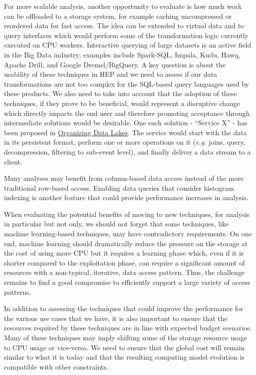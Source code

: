 \documentclass[12pt,a4paper]{article}
\begin{document}
For more scalable analysis, another opportunity to evaluate is how much
work can be offloaded to a storage system, for example caching
uncompressed or reordered data for fast access. The idea can be extended
to virtual data and to query interfaces which would perform some of the
transformation logic currently executed on CPU workers. Interactive
querying of large datasets is an active field in the Big Data industry;
examples include Spark-SQL, Impala, Kudu, Hawq, Apache Drill, and Google
Dremel/BigQuery. A key question is about the usability of these
techniques in HEP and we need to assess if our data transformations are
not too complex for the SQL-based query languages used by these
products. We also need to take into account that the adoption of these
techniques, if they prove to be beneficial, would represent a disruptive
change which directly impacts the end user and therefore promoting
acceptance through intermediate solutions would be desirable. One such solution - ``Service X'' - has been proposed in \href{https://bit.ly/2Ix9NIL}{Organizing Data Lakes}. The service would start with the data in its persistent format, perform one or more operations on it  (\emph{e.g.} joins, query, decompression, filtering to sub-event level), and finally deliver a data stream to a client.

Many analyses may benefit from column-based data access instead of the
more traditional row-based access. Enabling data queries that consider
histogram indexing is another feature that could provide performance
increases in analysis.

When evaluating the potential benefits of moving to new techniques, for
analysis in particular but not only, we should not forget that some
techniques, like machine learning-based techniques, may have
contradictory requirements. On one end, machine learning should
dramatically reduce the pressure on the storage at the cost of using
more CPU but it requires a learning phase which, even if it is shorter
compared to the exploitation phase, can require a significant amount of
resources with a non-typical, iterative, data access pattern. Thus, the
challenge remains to find a good compromise to efficiently support a
large variety of access patterns.

In addition to assessing the techniques that could improve the
performance for the various use cases that we have, it is also important
to ensure that the resources required by these techniques are in line
with expected budget scenarios. Many of these techniques may imply
shifting some of the storage resource usage to CPU usage or vice-versa.
We need to ensure that the global cost will remain similar to what it is
today and that the resulting computing model evolution is compatible
with other constraints.
\end{document}
